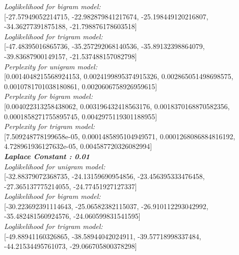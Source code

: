 \documentclass[11ppt]{article}
\begin{document}
\textit{Loglikelihood for bigram model:} \\ \vspace{1mm}  [-27.57949052214715, -22.982879841217674, -25.198449120216807, -34.36277391875188, -21.798876178603518]  \\ \vspace{2mm}
\textit{Loglikelihood for trigram model:} \\ \vspace{1mm}  [-47.48395016865736, -35.257292068140536, -35.89132398864079, -39.83687900149157, -21.537488157082798]  \\ \vspace{2mm}
\textit{Perplexity for unigram model:} \\ \vspace{1mm}  [0.0014048215568924153, 0.0024199895374915326, 0.002865051498698575, 0.0010781701038180861, 0.0020606758926959615]  \\ \vspace{2mm}
\textit{Perplexity for bigram model:} \\ \vspace{1mm}  [0.004022313258438062, 0.003196432418563176, 0.0018370168870582356, 0.0001858271755895745, 0.0042975119301188955]  \\ \vspace{2mm}
\textit{Perplexity for trigram model:} \\ \vspace{1mm}  [7.509248778199658e-05, 0.0001485895104949571, 0.0001268086884816192, 4.728961936127632e-05, 0.004587720326082994]  \\ \vspace{2mm}
\textit{\textbf{Laplace Constant : 0.01 }}\\ \vspace{2mm}
\textit{Loglikelihood for unigram model:} \\ \vspace{1mm}  [-32.88379072368735, -24.13159690954856, -23.456395333476458, -27.365137775214055, -24.77451927127337]  \\ \vspace{2mm}
\textit{Loglikelihood for bigram model:} \\ \vspace{1mm}  [-30.223692391114643, -25.06582382115037, -26.910112293042992, -35.482481560924576, -24.060599831541595]  \\ \vspace{2mm}
\textit{Loglikelihood for trigram model:} \\ \vspace{1mm}  [-49.88941160326865, -38.58944042024911, -39.57718998337484, -44.21534495761073, -29.066705800378298]  \\ \vspace{2mm}
\end{document}
